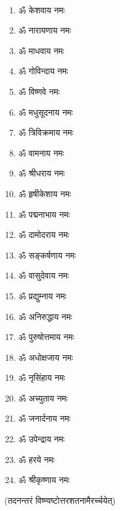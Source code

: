 {}\mbox{}\\[-3.5em]
\begin{multicols}{2}
\begin{enumerate}
\item ॐ केशवाय नमः
\item ॐ नारायणाय नमः
\item ॐ माधवाय नमः
\item ॐ गोविन्दाय नमः
\item ॐ विष्णवे नमः	
\item ॐ मधुसूदनाय नमः
\item ॐ त्रिविक्रमाय नमः
\item ॐ वामनाय नमः
\item ॐ श्रीधराय नमः
\item ॐ हृषीकेशाय नमः
\item ॐ पद्मनाभाय नमः
\item ॐ दामोदराय नमः
\item ॐ सङ्कर्षणाय नमः
\item ॐ वासुदेवाय नमः
\item ॐ प्रद्युम्नाय नमः
\item ॐ अनिरुद्धाय नमः
\item ॐ पुरुषोत्तमाय नमः
\item ॐ अधोक्षजाय नमः
\item ॐ नृसिंहाय नमः
\item ॐ अच्युताय नमः
\item ॐ जनार्दनाय नमः
\item ॐ उपेन्द्राय नमः 
\item ॐ हरये नमः
\item ॐ श्रीकृष्णाय नमः
\end{enumerate}
\end{multicols}

(तदनन्तरं विष्ण्वष्टोत्तरशतनामैरर्च्चयेत्)\\

